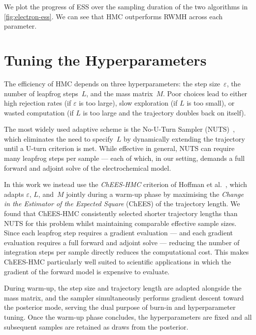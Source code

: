 We plot the progress of ESS over the sampling duration of the two
algorithms in \cref{fig:electron-ess}. We can see that HMC
outperforms RWMH across each parameter.



\section{Tuning the Hyperparameters}\label{sec:hmc-tuning}

The efficiency of HMC depends on three hyperparameters: the step
size~$\varepsilon$, the number of leapfrog steps~$L$, and the mass
matrix~$M$. Poor choices lead to either high rejection rates (if
$\varepsilon$ is too large), slow exploration (if $L$ is too small), or
wasted computation (if $L$ is too large and the trajectory doubles back on
itself).

The most widely used adaptive scheme is the No-U-Turn Sampler
(NUTS)~\cite{hoffman2014no}, which eliminates the need to specify~$L$ by
dynamically extending the trajectory until a U-turn criterion is met.
While effective in general, NUTS can require many leapfrog steps per
sample --- each of which, in our setting, demands a full forward and
adjoint solve of the electrochemical model.

In this work we instead use the \emph{ChEES-HMC} criterion of
Hoffman et al.~\cite{hoffman2021adaptive}, which adapts $\varepsilon$,
$L$, and~$M$ jointly during a warm-up phase by maximising the
\emph{Change in the Estimator of the Expected Square} (ChEES) of the
trajectory length. We found that ChEES-HMC consistently selected shorter
trajectory lengths than NUTS for this problem whilst maintaining
comparable effective sample sizes. Since each leapfrog step requires a
gradient evaluation --- and each gradient evaluation requires a full
forward and adjoint solve --- reducing the number of integration steps
per sample directly reduces the computational cost. This makes ChEES-HMC
particularly well suited to scientific applications in which the gradient
of the forward model is expensive to evaluate.

During warm-up, the step size and trajectory length are adapted alongside
the mass matrix, and the sampler simultaneously performs gradient descent
toward the posterior mode, serving the dual purpose of burn-in and
hyperparameter tuning. Once the warm-up phase concludes, the
hyperparameters are fixed and all subsequent samples are retained as draws
from the posterior.
